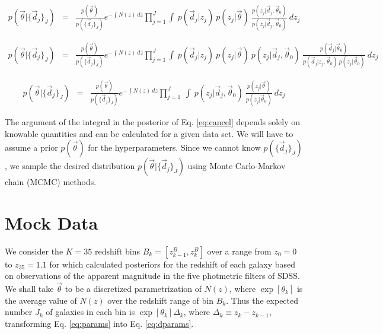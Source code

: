 \documentclass[12pt, onecolumn]{emulateapj}
\begin{document}
\begin{eqnarray}
\label{eq:trick}
p(\vec{\theta}|\{\vec{d}_{j}\}_{J}) &=& \frac{p(\vec{\theta})}{p(\{\vec{d}_{j}\}_{J})}e^{-\int N(z)\ dz}\prod_{j=1}^{J}\int\ p(\vec{d}_{j}|z_{j})\ p(z_{j}|\vec{\theta})\ \frac{p(z_{j}|\vec{d}_{j},\vec{\theta}_{0})}{p(z_{j}|\vec{d}_{j},\vec{\theta}_{0})}\ dz_{j}
\end{eqnarray}

\begin{eqnarray}
\label{eq:expand}
p(\vec{\theta}|\{\vec{d}_{j}\}_{J}) &=& \frac{p(\vec{\theta})}{p(\{\vec{d}_{j}\}_{J})}e^{-\int N(z)\ dz}\prod_{j=1}^{J}\int\ p(\vec{d}_{j}|z_{j})\ p(z_{j}|\vec{\theta})\ p(z_{j}|\vec{d}_{j},\vec{\theta}_{0})\ \frac{p(\vec{d}_{j}|\vec{\theta}_{0})}{p(\vec{d}_{j}|z_{j},\vec{\theta}_{0})\ p(z_{j}|\vec{\theta}_{0})}\ dz_{j}
\end{eqnarray}

\begin{eqnarray}
\label{eq:cancel}
p(\vec{\theta}|\{\vec{d}_{j}\}_{J}) &=& \frac{p(\vec{\theta})}{p(\{\vec{d}_{j}\}_{J})}e^{-\int N(z)\ dz}\prod_{j=1}^{J}\ \int\ p(z_{j}|\vec{d}_{j},\vec{\theta}_{0})\ \frac{p(z_{j}|\vec{\theta})}{p(z_{j}|\vec{\theta}_{0})}\ dz_{j}
\end{eqnarray}

The argument of the integral in the posterior of Eq. \ref{eq:cancel} depends solely on knowable quantities and can be calculated for a given data set.  We will have to assume a prior $p(\vec{\theta})$ for the hyperparameters.   Since we cannot know $p(\{\vec{d}_{j}\}_{J})$, we sample the desired distribution $p(\vec{\theta}|\{\vec{d}_{j}\}_{J})$ using Monte Carlo-Markov chain (MCMC) methods.  

\section{Mock Data}
\label{sec:mock}

We consider the $K=35$ redshift bins $B_{k}=[z^{B}_{k-1},z^{B}_{k}]$ over a range from $z_{0}=0$ to $z_{35}=1.1$ for which \citet{she11} calculated posteriors for the redshift of each galaxy based on observations of the apparent magnitude in the five photmetric filters of SDSS.  We shall take $\vec{\theta}$ to be a discretized parametrization of $N(z)$, where $\exp[\theta_{k}]$ is the average value of $N(z)$ over the redshift range of bin $B_{k}$.   Thus the expected number $J_{k}$ of galaxies in each bin is $\exp[\theta_{k}]\Delta_{k}$, where $\Delta_{k}\equiv z_{k}-z_{k-1}$, transforming Eq. \ref{eq:params} into Eq. \ref{eq:dparams}.  
\end{document}

